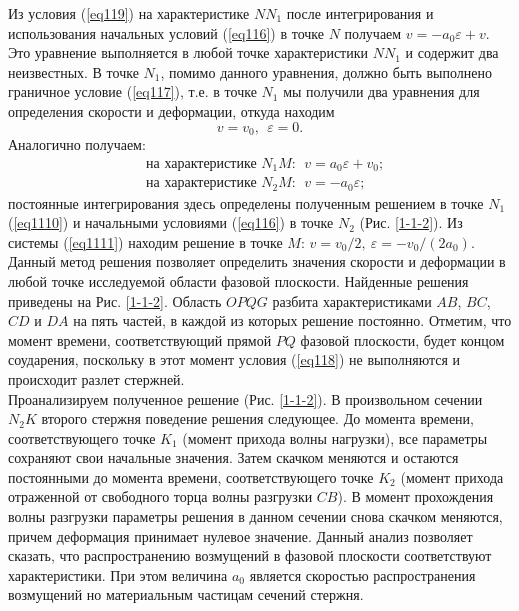\documentclass[specialist, subf, href, colorlinks=true, 14pt, final]{disser}
\theoremstyle{definition}
\begin{document}
Из условия (\ref{eq119}) на характеристике $NN_1$ после интегрирования
и использования начальных условий (\ref{eq116}) в точке $N$ получаем $v = -a_{0}\varepsilon + v$. Это уравнение выполняется в любой точке характеристики $NN_1$ и содержит два неизвестных. В точке $N_1$, помимо данного уравнения, должно быть выполнено граничное условие (\ref{eq117}), т.е. в точке $N_1$ мы получили два уравнения для определения скорости и деформации, откуда находим
\begin{equation}\label{eq1110}
  v = v_{0},\ \ \varepsilon = 0.
\end{equation}
Аналогично получаем:
\begin{equation}\label{eq1111}
  \begin{aligned}
  &\text{на характеристике } N_{1}M:\ \ v = a_{0}\varepsilon + v_{0};\\
  &\text{на характеристике } N_{2}M:\ \ v = -a_{0}\varepsilon;
  \end{aligned}
\end{equation}
постоянные интегрирования здесь определены полученным решением в точке $N_1$ (\ref{eq1110}) и начальными условиями (\ref{eq116}) в точке $N_2$ (Рис. \ref{1-1-2}). Из системы (\ref{eq1111}) находим решение в точке $M$: $v = v_{0}/2,\ \varepsilon = -v_{0}/(2a_{0})$. Данный метод решения позволяет определить значения скорости и деформации в любой точке исследуемой области фазовой плоскости. Найденные решения приведены на Рис. \ref{1-1-2}. Область
$OPQG$ разбита характеристиками $AB$, $BC$, $CD$ и $DA$ на пять частей, в каждой из которых решение постоянно. Отметим, что момент времени, соответствующий прямой $PQ$ фазовой плоскости, будет концом соударения,
поскольку в этот момент условия (\ref{eq118}) не выполняются и происходит разлет стержней.\\
Проанализируем полученное решение (Рис. \ref{1-1-2}). В произвольном
сечении $N_{2}K$ второго стержня поведение решения следующее. До 
момента времени, соответствующего точке $K_1$ (момент прихода волны
нагрузки), все параметры сохраняют свои начальные значения. Затем
скачком меняются и остаются постоянными до момента времени, соответствующего точке $K_2$ (момент прихода отраженной от свободного
торца волны разгрузки $CB$). В момент прохождения волны разгрузки параметры решения в данном сечении снова скачком меняются, причем деформация принимает нулевое значение. Данный анализ позволяет сказать, что распространению возмущений в фазовой плоскости соответствуют характеристики. При этом величина $a_0$ является скоростью распространения возмущений но материальным частицам сечений стержня.\\
\end{document}
